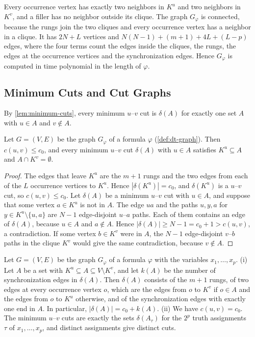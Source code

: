 \documentclass[pdflatex,sn-mathphys-num]{sn-jnl}%
\theoremstyle{thmstyleone}%
\theoremstyle{thmstyletwo}%
\theoremstyle{thmstylethree}%
\begin{document}
Every occurrence vertex has exactly two neighbors in $K^u$ and two neighbors in $K^v$, and a filler has no neighbor outside its clique.
The graph $G_\varphi$ is connected, because the rungs join the two cliques and every occurrence vertex has a neighbor in a clique.
It has $2N + L$ vertices and $N(N - 1) + (m + 1) + 4L + (L - p)$ edges, where the four terms count the edges inside the cliques, the rungs, the edges at the occurrence vertices and the synchronization edges.
Hence $G_\varphi$ is computed in time polynomial in the length of $\varphi$.

\subsection{Minimum Cuts and Cut Graphs}
\label{sec:dt-correctness}

By \cref{lem:minimum-cuts}, every minimum $u$--$v$ cut is $\delta(A)$ for exactly one set $A$ with $u \in A$ and $v \notin A$.

\begin{lemma}[Forcing]
\label{lem:dt-forcing}
Let $G = (V, E)$ be the graph $G_\varphi$ of a formula $\varphi$ (\cref{def:dt-graph}).
Then $c(u, v) \leq c_0$, and every minimum $u$--$v$ cut $\delta(A)$ with $u \in A$ satisfies $K^u \subseteq A$ and $A \cap K^v = \emptyset$.
\end{lemma}

\begin{proof}
The edges that leave $K^u$ are the $m + 1$ rungs and the two edges from each of the $L$ occurrence vertices to $K^u$.
Hence $|\delta(K^u)| = c_0$, and $\delta(K^u)$ is a $u$--$v$ cut, so $c(u, v) \leq c_0$.
Let $\delta(A)$ be a minimum $u$--$v$ cut with $u \in A$, and suppose that some vertex $a \in K^u$ is not in $A$.
The edge $ua$ and the paths $u, y, a$ for $y \in K^u \setminus \{u, a\}$ are $N - 1$ edge-disjoint $u$--$a$ paths.
Each of them contains an edge of $\delta(A)$, because $u \in A$ and $a \notin A$.
Hence $|\delta(A)| \geq N - 1 = c_0 + 1 > c(u, v)$, a contradiction.
If some vertex $b \in K^v$ were in $A$, the $N - 1$ edge-disjoint $v$--$b$ paths in the clique $K^v$ would give the same contradiction, because $v \notin A$.
\end{proof}

\begin{lemma}
\label{lem:dt-cuts}
Let $G = (V, E)$ be the graph $G_\varphi$ of a formula $\varphi$ with the variables $x_1, \dots, x_p$.
(i) Let $A$ be a set with $K^u \subseteq A \subseteq V \setminus K^v$, and let $k(A)$ be the number of synchronization edges in $\delta(A)$.
Then $\delta(A)$ consists of the $m + 1$ rungs, of two edges at every occurrence vertex $o$, which are the edges from $o$ to $K^v$ if $o \in A$ and the edges from $o$ to $K^u$ otherwise, and of the synchronization edges with exactly one end in $A$.
In particular, $|\delta(A)| = c_0 + k(A)$.
(ii) We have $c(u, v) = c_0$.
The minimum $u$--$v$ cuts are exactly the sets $\delta(A_\tau)$ for the $2^p$ truth assignments $\tau$ of $x_1, \dots, x_p$, and distinct assignments give distinct cuts.
\end{lemma}
\end{document}
